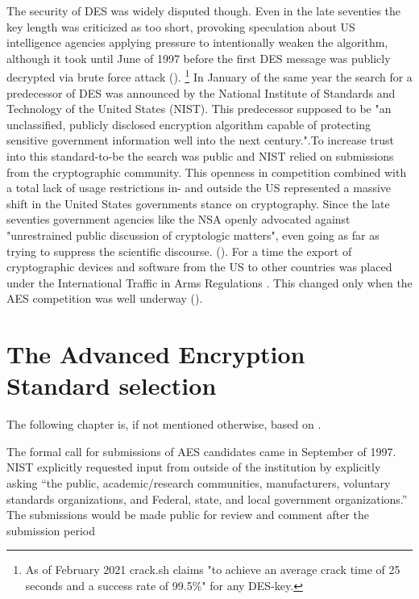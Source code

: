 The security of DES was widely disputed though. Even in the late seventies the key length was criticized as too short, provoking speculation about \ac{US} intelligence agencies applying pressure to intentionally weaken the algorithm, although it took until June of 1997 before the first DES message was publicly decrypted via brute force attack (\cite[p.112]{appcrypt}). \footnote{As of February 2021 crack.sh claims "to achieve an average crack time of 25 seconds and a success rate of 99.5\%" for any DES-key.} In January of the same year the search for a predecessor of DES was announced by the National Institute of Standards and Technology of the United States (NIST). This predecessor supposed to be "an unclassified, publicly disclosed encryption algorithm capable of protecting sensitive government information well into the next century."\cite[p. 1]{announcementrequest}.To increase trust into this standard-to-be the search was public and \ac{NIST} relied on submissions from the cryptographic community.
This openness in competition combined with a total lack of usage restrictions in- and outside the \ac{US} represented a massive shift in the United States governments stance on cryptography. 
Since the late seventies government agencies like the \ac{NSA} openly advocated against "unrestrained public discussion of cryptologic matters", even going as far as trying to suppress the scientific discourse. (\cite[p. 151-152]{cyberhist}). For a time the export of cryptographic devices and software from the \ac{US} to other countries was placed under the International Traffic in Arms Regulations \cite[Category XIII--Auxiliary Military Equipment $(1)$]{armslaw} . This changed only when the \ac{AES} competition was well underway (\cite{revisedlaw}).

\section{The Advanced Encryption Standard selection}
\label{ch:aes-selection}

The following chapter is, if not mentioned otherwise, based on \cite{nistdevoverview}.

The formal call for submissions of \ac{AES} candidates came in September of 1997. \ac{NIST} explicitly requested input from outside of the institution by explicitly asking \enquote{the public, academic/research communities, manufacturers, voluntary standards organizations, and Federal, state, and local government organizations.} The submissions would be made public for review and comment after the submission period


